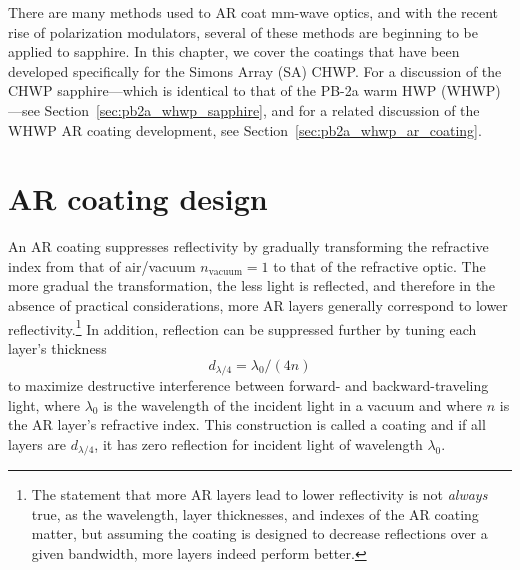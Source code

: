 There are many methods used to AR coat mm-wave optics, and with the recent rise of polarization modulators, several of these methods are beginning to be applied to sapphire. In this chapter, we cover the coatings that have been developed specifically for the Simons Array (SA) CHWP. For a discussion of the CHWP sapphire---which is identical to that of the PB-2a warm HWP (WHWP)---see Section~\ref{sec:pb2a_whwp_sapphire}, and for a related discussion of the WHWP AR coating development, see Section~\ref{sec:pb2a_whwp_ar_coating}.


\section{AR coating design}
\label{sec:sapphire_ar_coating_design}

An AR coating suppresses reflectivity by gradually transforming the refractive index from that of air/vacuum $n_{\mathrm{vacuum}} = 1$ to that of the refractive optic. The more gradual the transformation, the less light is reflected, and therefore in the absence of practical considerations, more AR layers generally correspond to lower reflectivity.\footnote{The statement that more AR layers lead to lower reflectivity is not \textit{always} true, as the wavelength, layer thicknesses, and indexes of the AR coating matter, but assuming the coating is designed to decrease reflections over a given bandwidth, more layers indeed perform better.} In addition, reflection can be suppressed further by tuning each layer's thickness 
\begin{equation}
    d_{\lambda / 4} = \lambda_{0} / (4 n)
    \label{eq:lambda_over_four_thickness}
\end{equation}
to maximize destructive interference between forward- and backward-traveling light, where $\lambda_{0}$ is the wavelength of the incident light in a vacuum and where $n$ is the AR layer's refractive index. This construction is called a  coating and if all layers are $d_{\lambda / 4}$, it has zero reflection for incident light of wavelength $\lambda_{0}$.

